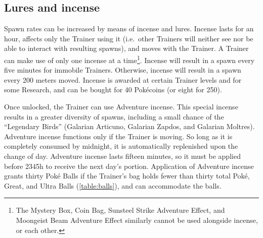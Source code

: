 \subsection{Lures and incense}
\label{subsec:lures}
Spawn rates can be increased by means of incense and lures.
Incense lasts for an hour, affects only the Trainer using it (i.e.\ other Trainers
  will neither see nor be able to interact with resulting spawns),
  and moves with the Trainer.
A Trainer can make use of only one incense at a time\footnote{The
  Mystery Box, Coin Bag, Sunsteel Strike Adventure Effect, and
  Moongeist Beam Adventure Effect similarly cannot be used
  alongside incense, or each other.}.
Incense will result in a spawn every five minutes for immobile Trainers.
Otherwise, incense will result in a spawn every 200 meters moved.
Incense is awarded at certain Trainer levels and for some Research,
  and can be bought for 40 Pokécoins (or eight for 250).

Once unlocked, the Trainer can use Adventure incense.
This special incense results in a greater diversity of spawns, including
  a small chance of the ``Legendary Birds''
  (Galarian Articuno, Galarian Zapdos, and Galarian Moltres).
Adventure incense functions only if the Trainer is moving.
So long as it is completely consumed by midnight, it is automatically replenished
  upon the change of day.
Adventure incense lasts fifteen minutes, so it must be applied before 2345h
  to receive the next day's portion.
Application of Adventure incense grants thirty Poké Balls if the Trainer's
  bag holds fewer than thirty total Poké, Great, and Ultra Balls (\autoref{table:balls}),
  and can accommodate the balls.


